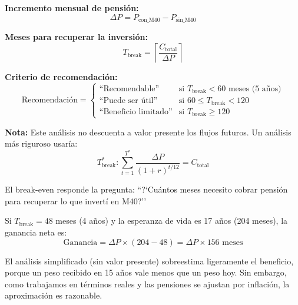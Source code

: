 \documentclass[11pt,a4paper]{report}
\theoremstyle{remark}
\begin{document}
\begin{tcolorbox}[colback=blue!5!white, colframe=blue!75!black, title=\textbf{Definici\'on Formal}]
\textbf{Incremento mensual de pensi\'on:}
\begin{equation}
\Delta P = P_{\text{con\_M40}} - P_{\text{sin\_M40}}
\end{equation}

\textbf{Meses para recuperar la inversi\'on:}
\begin{equation}
T_{\text{break}} = \left\lceil \frac{C_{\text{total}}}{\Delta P} \right\rceil
\label{eq:break_even}
\end{equation}

\textbf{Criterio de recomendaci\'on:}
\begin{equation}
\text{Recomendaci\'on} = \begin{cases}
\text{``Recomendable''} & \text{si } T_{\text{break}} < 60 \text{ meses (5 a\~nos)} \\
\text{``Puede ser \'util''} & \text{si } 60 \leq T_{\text{break}} < 120 \\
\text{``Beneficio limitado''} & \text{si } T_{\text{break}} \geq 120
\end{cases}
\end{equation}

\textbf{Nota:} Este an\'alisis no descuenta a valor presente los flujos futuros. Un an\'alisis m\'as riguroso usar\'ia:
\begin{equation}
T_{\text{break}}^* : \sum_{t=1}^{T^*} \frac{\Delta P}{(1+r)^{t/12}} = C_{\text{total}}
\end{equation}
\end{tcolorbox}

\begin{tcolorbox}[colback=green!5!white, colframe=green!50!black, title=\textbf{Intuici\'on}]
El break-even responde la pregunta: ``?`Cu\'antos meses necesito cobrar pensi\'on para recuperar lo que invert\'i en M40?''

Si $T_{\text{break}} = 48$ meses (4 a\~nos) y la esperanza de vida es 17 a\~nos (204 meses), la ganancia neta es:
\[
\text{Ganancia} = \Delta P \times (204 - 48) = \Delta P \times 156 \text{ meses}
\]

El an\'alisis simplificado (sin valor presente) sobreestima ligeramente el beneficio, porque un peso recibido en 15 a\~nos vale menos que un peso hoy. Sin embargo, como trabajamos en t\'erminos reales y las pensiones se ajustan por inflaci\'on, la aproximaci\'on es razonable.
\end{tcolorbox}
\end{document}
